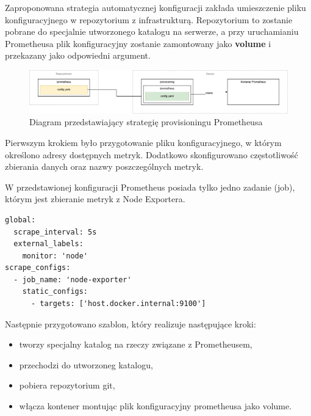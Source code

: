 \documentclass{article}
\begin{document}
Zaproponowana strategia automatycznej konfiguracji zakłada umieszczenie pliku konfiguracyjnego w repozytorium z infrastrukturą. Repozytorium to zostanie pobrane do specjalnie utworzonego katalogu na serwerze, a przy uruchamianiu Prometheusa plik konfiguracyjny zostanie zamontowany jako \textbf{volume} i przekazany jako odpowiedni argument.

\begin{figure}[H]
    \centering
    \includegraphics[width=1\linewidth]{diagramProvisionPrometheus.png}
    \caption{Diagram przedstawiający strategię provisioningu Prometheusa}
    \label{fig:enter-label}
\end{figure}

Pierwszym krokiem było przygotowanie pliku konfiguracyjnego, w którym określono adresy dostępnych metryk. Dodatkowo skonfigurowano częstotliwość zbierania danych oraz nazwy poszczególnych metryk.

W przedstawionej konfiguracji Prometheus posiada tylko jedno zadanie (job), którym jest zbieranie metryk z Node Exportera.

\begin{lstlisting}[caption=Plik \texttt{infrastructure/prometheus/prometheus.yml}]
global:
  scrape_interval: 5s
  external_labels:
    monitor: 'node'
scrape_configs:
  - job_name: 'node-exporter'
    static_configs:
      - targets: ['host.docker.internal:9100']

\end{lstlisting}

Następnie przygotowano szablon, który realizuje następujące kroki:
\begin{itemize}
    \item tworzy specjalny katalog na rzeczy związane z Prometheusem,
    \item przechodzi do utworzoneg katalogu,
    \item pobiera repozytorium git,
    \item włącza kontener montując plik konfiguracyjny prometheusa jako volume.
\end{itemize}
\end{document}
